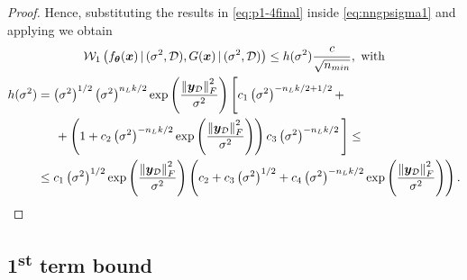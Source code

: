 \begin{proof}
	Hence, substituting the results in \cref{eq:p1-4final} inside \cref{eq:nngpsigma1} and applying  we obtain
	\begin{equation*}
		\begin{gathered}
			\wass[1]{f_{\bm{\theta}}(\bm{x}) \given (\sigma^2, \train)}{G(\bm{x}) \given (\sigma^2, \train)} \leq h(\sigma^2) \frac{c}{\sqrt{n_{min}}}, \text{ with} \\
			\begin{aligned}
				h(\sigma^2) & = \left(\sigma^2\right)^{1/2} \left(\sigma^2\right)^{n_L k / 2} \exp{\frac{\norm{\bm{y}_{\mathcal{D}}}_F^2}{\sigma^2}} \Bigg[c_1 \left(\sigma^2\right)^{- n_L k / 2 + 1/2} + \\
				& \blankeq + \left(1 + c_2 \left(\sigma^2\right)^{- n_L k / 2} \exp{\frac{\norm{\bm{y}_{\mathcal{D}}}_F^2}{\sigma^2}} \right) c_3 \left(\sigma^2\right)^{- n_L k / 2}\Bigg] \leq \\
				& \leq c_1 \left(\sigma^2\right)^{1/2} \exp{\frac{\norm{\bm{y}_{\mathcal{D}}}_F^2}{\sigma^2}} \left(c_2 + c_3 \left(\sigma^2\right)^{1/2} + c_4 \left(\sigma^2\right)^{- n_L k / 2} \exp{\frac{\norm{\bm{y}_{\mathcal{D}}}_F^2}{\sigma^2}}\right).
			\end{aligned}
		\end{gathered}
	\end{equation*}
\end{proof}

\subsection{\texorpdfstring{1\textsuperscript{st}}{First} term bound} \label{subsec:firstterm}

